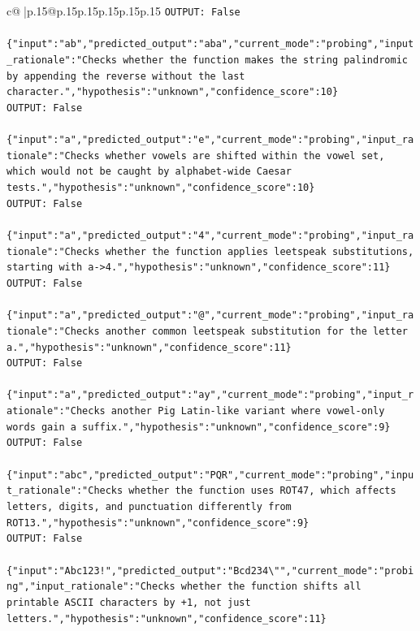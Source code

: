 \documentclass{article}
\begin{document}
{\begin{supertabular}{c@{$\;$}|p{.15\linewidth}@{}p{.15\linewidth}p{.15\linewidth}p{.15\linewidth}p{.15\linewidth}p{.15\linewidth}}
{{{\texttt{OUTPUT: False} \\
\\ 
\texttt{\{"input":"ab","predicted\_output":"aba","current\_mode":"probing","input\_rationale":"Checks whether the function makes the string palindromic by appending the reverse without the last character.","hypothesis":"unknown","confidence\_score":10\}} \\
\texttt{OUTPUT: False} \\
\\ 
\texttt{\{"input":"a","predicted\_output":"e","current\_mode":"probing","input\_rationale":"Checks whether vowels are shifted within the vowel set, which would not be caught by alphabet{-}wide Caesar tests.","hypothesis":"unknown","confidence\_score":10\}} \\
\texttt{OUTPUT: False} \\
\\ 
\texttt{\{"input":"a","predicted\_output":"4","current\_mode":"probing","input\_rationale":"Checks whether the function applies leetspeak substitutions, starting with a{-}>4.","hypothesis":"unknown","confidence\_score":11\}} \\
\texttt{OUTPUT: False} \\
\\ 
\texttt{\{"input":"a","predicted\_output":"@","current\_mode":"probing","input\_rationale":"Checks another common leetspeak substitution for the letter a.","hypothesis":"unknown","confidence\_score":11\}} \\
\texttt{OUTPUT: False} \\
\\ 
\texttt{\{"input":"a","predicted\_output":"ay","current\_mode":"probing","input\_rationale":"Checks another Pig Latin{-}like variant where vowel{-}only words gain a suffix.","hypothesis":"unknown","confidence\_score":9\}} \\
\texttt{OUTPUT: False} \\
\\ 
\texttt{\{"input":"abc","predicted\_output":"PQR","current\_mode":"probing","input\_rationale":"Checks whether the function uses ROT47, which affects letters, digits, and punctuation differently from ROT13.","hypothesis":"unknown","confidence\_score":9\}} \\
\texttt{OUTPUT: False} \\
\\ 
\texttt{\{"input":"Abc123!","predicted\_output":"Bcd234\textbackslash{}"","current\_mode":"probing","input\_rationale":"Checks whether the function shifts all printable ASCII characters by +1, not just letters.","hypothesis":"unknown","confidence\_score":11\}} \\
}}}
\end{supertabular}}
\end{document}
